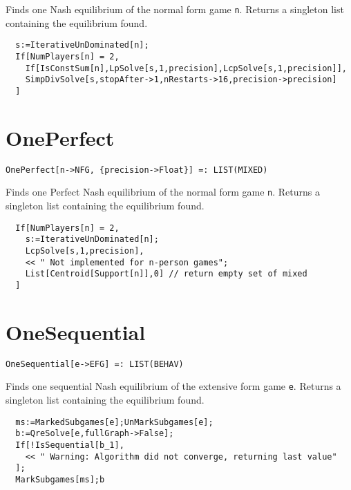 \noindent
Finds one Nash equilibrium of the normal form game \verb+n+.
Returns a singleton list containing the equilibrium found.

\udfbody
\begin{verbatim}
  s:=IterativeUnDominated[n];
  If[NumPlayers[n] = 2,
    If[IsConstSum[n],LpSolve[s,1,precision],LcpSolve[s,1,precision]],
    SimpDivSolve[s,stopAfter->1,nRestarts->16,precision->precision]
  ]
\end{verbatim} 


\section*{OnePerfect}\label{ExtOnePerfect}
\begin{verbatim}
OnePerfect[n->NFG, {precision->Float}] =: LIST(MIXED) 
\end{verbatim}

\noindent
Finds one Perfect Nash equilibrium of the normal form game
\verb+n+.  Returns a singleton list containing the equilibrium found.

\udfbody
\begin{verbatim}
  If[NumPlayers[n] = 2, 
    s:=IterativeUnDominated[n];
    LcpSolve[s,1,precision],
    << " Not implemented for n-person games";
    List[Centroid[Support[n]],0] // return empty set of mixed
  ]
\end{verbatim} 


\section*{OneSequential}\label{ExtOneSequential}
\begin{verbatim}
OneSequential[e->EFG] =: LIST(BEHAV) 
\end{verbatim}

\noindent
Finds one sequential Nash equilibrium of the extensive form game
\verb+e+.  Returns a singleton list containing the equilibrium found.

\udfbody
\begin{verbatim}
  ms:=MarkedSubgames[e];UnMarkSubgames[e];
  b:=QreSolve[e,fullGraph->False];
  If[!IsSequential[b_1],
    << " Warning: Algorithm did not converge, returning last value"
  ];
  MarkSubgames[ms];b
\end{verbatim} 

